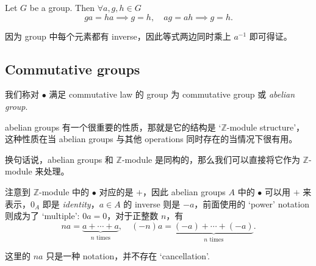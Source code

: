 \begin{proposition}\label{prop:2.1.8}
    Let \(G\) be a group. Then \(\forall a, g, h \in G\)
    \[ga = ha \implies g = h, \quad ag = ah \implies g = h.\]
\end{proposition}
\begin{explanation}
    因为 group 中每个元素都有 inverse，因此等式两边同时乘上 \(a^{-1}\) 即可得证。
\end{explanation}

\subsection{Commutative groups}\label{sec:2.1.5}

我们称对 \(\bullet\) 满足 commutative law 的 group 为 commutative group 或 \emph{abelian group}.

abelian groups 有一个很重要的性质，那就是它的结构是 `\(\mathbb{Z}\)-module structure'，这种性质在当 abelian groups 与其他 operations 同时存在的当情况下很有用。

换句话说，abelian groups 和 \(\mathbb{Z}\)-module 是同构的，那么我们可以直接将它作为 \(\mathbb{Z}\)-module 来处理。

注意到 \(\mathbb{Z}\)-module 中的 \(\bullet\) 对应的是 \(+\)，因此 abelian groups \(A\) 中的 \(\bullet\) 可以用 \(+\) 来表示，\(0_A\) 即是 \emph{identity}，\(a \in A\) 的 inverse 则是 \(-a\)，前面使用的 `power' notation 则成为了 `multiple': \(0a = 0\)，对于正整数 \(n\)，有
\[na = \underbrace{a + \cdots + a}_{n \text{ times}}, \quad (-n)a = \underbrace{(-a) + \cdots + (-a)}_{n \text{ times}}.\]

\begin{remark}
    这里的 \(na\) 只是一种 notation，并不存在 `cancellation'.
\end{remark}